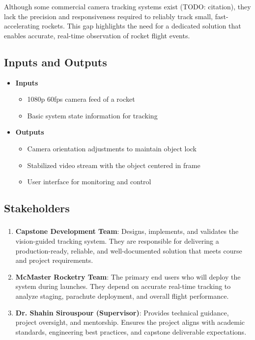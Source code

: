 \documentclass{article}
\begin{document}
Although some commercial camera tracking systems exist (TODO: citation), they
lack the precision and responsiveness required to reliably track small,
fast-accelerating rockets. This gap highlights the need for a dedicated solution
that enables accurate, real-time observation of rocket flight events.

\subsection{Inputs and Outputs}
\begin{itemize}
    \item \textbf{Inputs}
    \begin{itemize}
        \item 1080p 60fps camera feed of a rocket
        \item Basic system state information for tracking
    \end{itemize}

    \item \textbf{Outputs}
    \begin{itemize}
        \item Camera orientation adjustments to maintain object lock
        \item Stabilized video stream with the object centered in frame
        \item User interface for monitoring and control
    \end{itemize}
\end{itemize}


\subsection{Stakeholders}

\subsubsection*{\color{blue}{Direct Stakeholders}}
\begin{enumerate}
    \item \textbf{Capstone Development Team}: Designs, implements, and validates the vision-guided tracking system. They are responsible for delivering a production-ready, reliable, and well-documented solution that meets course and project requirements.  

    \item \textbf{McMaster Rocketry Team}: The primary end users who will deploy the system during launches. They depend on accurate real-time tracking to analyze staging, parachute deployment, and overall flight performance.  

    \item \textbf{Dr. Shahin Sirouspour (Supervisor)}: Provides technical guidance, project oversight, and mentorship. Ensures the project aligns with academic standards, engineering best practices, and capstone deliverable expectations.  
\end{enumerate}
\end{document}
